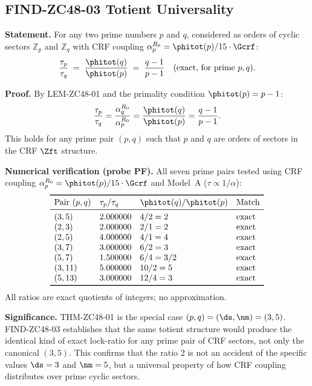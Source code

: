 \documentclass[12pt, a4paper]{article}
\begin{document}
\subsection{FIND-ZC48-03 \quad Totient Universality}
\label{sec:find03}


\begin{derivedbox}[title={FIND-ZC48-03: Totient Universality
  for Prime Cyclic Sectors}]
\textbf{Statement.}
For any two prime numbers $p$ and $q$, considered as orders
of cyclic sectors $\mathbb{Z}_p$ and $\mathbb{Z}_q$ with
CRF coupling $\alpha_p^{R_0} = \phitot(p)/15\cdot\Gcrf$:
\begin{equation}
  \frac{\tau_p}{\tau_q}
  \;=\;
  \frac{\phitot(q)}{\phitot(p)}
  \;=\;
  \frac{q-1}{p-1}
  \quad \text{(exact, for prime $p, q$).}
  \label{eq:universal}
\end{equation}

\textbf{Proof.}
By LEM-ZC48-01 and the primality condition $\phitot(p) = p-1$:
\[
  \frac{\tau_p}{\tau_q}
  = \frac{\alpha_q^{R_0}}{\alpha_p^{R_0}}
  = \frac{\phitot(q)}{\phitot(p)}
  = \frac{q-1}{p-1}.
\]
This holds for any prime pair $(p,q)$ such that $p$ and $q$
are orders of sectors in the CRF $\Zft$ structure.

\textbf{Numerical verification (probe PF).}
All seven prime pairs tested using CRF coupling $\alpha_p^{R_0}
= \phitot(p)/15\cdot\Gcrf$ and Model~A ($\tau \propto 1/\alpha$):
\[
\begin{array}{lllll}
\toprule
\text{Pair } (p,q) & \tau_p/\tau_q & \phitot(q)/\phitot(p)
  & \text{Match} \\
\midrule
(3,5)  & 2.000000 & 4/2 = 2     & \text{exact} \\
(2,3)  & 2.000000 & 2/1 = 2     & \text{exact} \\
(2,5)  & 4.000000 & 4/1 = 4     & \text{exact} \\
(3,7)  & 3.000000 & 6/2 = 3     & \text{exact} \\
(5,7)  & 1.500000 & 6/4 = 3/2   & \text{exact} \\
(3,11) & 5.000000 & 10/2 = 5    & \text{exact} \\
(5,13) & 3.000000 & 12/4 = 3    & \text{exact} \\
\bottomrule
\end{array}
\]
All ratios are exact quotients of integers; no approximation.

\textbf{Significance.}
THM-ZC48-01 is the special case $(p,q) = (\ds, \nm) = (3,5)$.
FIND-ZC48-03 establishes that the same totient structure
would produce the identical kind of exact lock-ratio for any
prime pair of CRF sectors, not only the canonical $(3,5)$.
This confirms that the ratio 2 is not an accident of the
specific values $\ds = 3$ and $\nm = 5$, but a universal
property of how CRF coupling distributes over prime
cyclic sectors.
\end{derivedbox}
\end{document}
